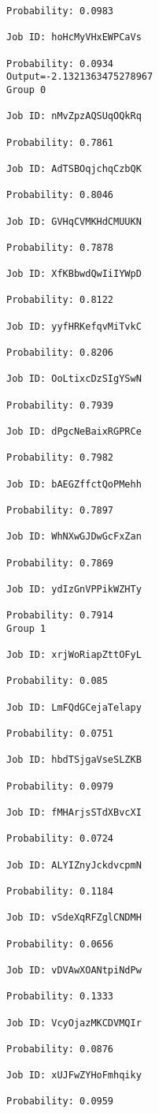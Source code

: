 \documentclass[11pt]{article}
\begin{document}
\begin{Verbatim}[commandchars=\\\{\}]
Probability: 0.0983

Job ID: hoHcMyVHxEWPCaVs

Probability: 0.0934
Output=-2.1321363475278967
Group 0

Job ID: nMvZpzAQSUqOQkRq

Probability: 0.7861

Job ID: AdTSBOqjchqCzbQK

Probability: 0.8046

Job ID: GVHqCVMKHdCMUUKN

Probability: 0.7878

Job ID: XfKBbwdQwIiIYWpD

Probability: 0.8122

Job ID: yyfHRKefqvMiTvkC

Probability: 0.8206

Job ID: OoLtixcDzSIgYSwN

Probability: 0.7939

Job ID: dPgcNeBaixRGPRCe

Probability: 0.7982

Job ID: bAEGZffctQoPMehh

Probability: 0.7897

Job ID: WhNXwGJDwGcFxZan

Probability: 0.7869

Job ID: ydIzGnVPPikWZHTy

Probability: 0.7914
Group 1

Job ID: xrjWoRiapZttOFyL

Probability: 0.085

Job ID: LmFQdGCejaTelapy

Probability: 0.0751

Job ID: hbdTSjgaVseSLZKB

Probability: 0.0979

Job ID: fMHArjsSTdXBvcXI

Probability: 0.0724

Job ID: ALYIZnyJckdvcpmN

Probability: 0.1184

Job ID: vSdeXqRFZglCNDMH

Probability: 0.0656

Job ID: vDVAwXOANtpiNdPw

Probability: 0.1333

Job ID: VcyOjazMKCDVMQIr

Probability: 0.0876

Job ID: xUJFwZYHoFmhqiky

Probability: 0.0959


\end{Verbatim}
\end{document}
